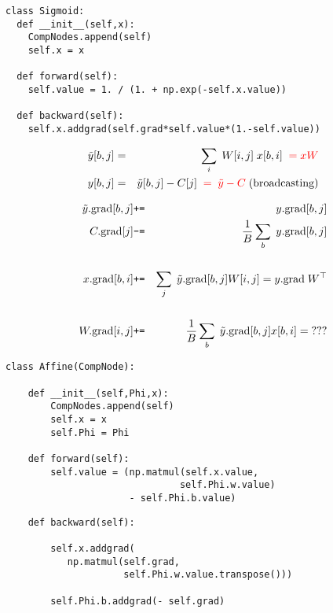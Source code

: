 {\begin{verbatim}
class Sigmoid:
  def __init__(self,x):
    CompNodes.append(self)
    self.x = x

  def forward(self):
    self.value = 1. / (1. + np.exp(-self.x.value))

  def backward(self):
    self.x.addgrad(self.grad*self.value*(1.-self.value))
\end{verbatim}


\vspace{-3ex}
\begin{eqnarray*}
  \tilde{y}[b,j] & = & \sum_i\;W[i,j]\;x[b,i] {\color{red}\;\; = xW}  \\
  y[b,j] & = & \tilde{y}[b,j] - C[j] {\color{red} \;\;=\;\tilde{y} - C}\; \mathrm{(broadcasting)}
  \end{eqnarray*}

\vspace{-2ex}
{\color{red}
\begin{eqnarray*}
  \tilde{y}.\mathrm{grad}[b,j] &\mbox{\tt +=} & y.\mathrm{grad}[b,j] \\
  C.\mathrm{grad}[j] & \mbox{\tt -=} & \frac{1}{B} \sum_b\;y.\mathrm{grad}[b,j] \\
  \\
  x.\mathrm{grad}[b,i] & \mbox{\tt +=} & \sum_j\;\tilde{y}.\mathrm{grad}[b,j]W[i,j] = y.\mathrm{grad}\;W^\top\\
  \\
  W.\mathrm{grad}[i,j] & \mbox{\tt +=} & \frac{1}{B} \sum_b\;\tilde{y}.\mathrm{grad}[b,j]x[b,i] =\; ???
\end{eqnarray*}
}

\slide{}

\begin{verbatim}
class Affine(CompNode):

    def __init__(self,Phi,x):
        CompNodes.append(self)
        self.x = x
        self.Phi = Phi

    def forward(self):
        self.value = (np.matmul(self.x.value,
                               self.Phi.w.value)
                      - self.Phi.b.value)
\end{verbatim}

\slide{}

\begin{verbatim}
    def backward(self):

        self.x.addgrad(
           np.matmul(self.grad,
                     self.Phi.w.value.transpose()))

        self.Phi.b.addgrad(- self.grad)


\end{verbatim}}
